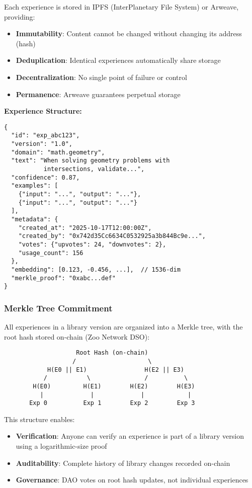 \documentclass[11pt,a4paper]{article}
\begin{document}
Each experience is stored in IPFS (InterPlanetary File System) or Arweave, providing:
\begin{itemize}
    \item \textbf{Immutability}: Content cannot be changed without changing its address (hash)
    \item \textbf{Deduplication}: Identical experiences automatically share storage
    \item \textbf{Decentralization}: No single point of failure or control
    \item \textbf{Permanence}: Arweave guarantees perpetual storage
\end{itemize}

\textbf{Experience Structure:}
\begin{verbatim}
{
  "id": "exp_abc123",
  "version": "1.0",
  "domain": "math.geometry",
  "text": "When solving geometry problems with
           intersections, validate...",
  "confidence": 0.87,
  "examples": [
    {"input": "...", "output": "..."},
    {"input": "...", "output": "..."}
  ],
  "metadata": {
    "created_at": "2025-10-17T12:00:00Z",
    "created_by": "0x742d35Cc6634C0532925a3b844Bc9e...",
    "votes": {"upvotes": 24, "downvotes": 2},
    "usage_count": 156
  },
  "embedding": [0.123, -0.456, ...],  // 1536-dim
  "merkle_proof": "0xabc...def"
}
\end{verbatim}

\subsubsection{Merkle Tree Commitment}

All experiences in a library version are organized into a Merkle tree, with the root hash stored on-chain (Zoo Network DSO):

\begin{verbatim}
                    Root Hash (on-chain)
                   /                    \
            H(E0 || E1)                H(E2 || E3)
           /           \               /          \
        H(E0)         H(E1)        H(E2)        H(E3)
          |             |             |            |
       Exp 0          Exp 1        Exp 2        Exp 3
\end{verbatim}

This structure enables:
\begin{itemize}
    \item \textbf{Verification}: Anyone can verify an experience is part of a library version using a logarithmic-size proof
    \item \textbf{Auditability}: Complete history of library changes recorded on-chain
    \item \textbf{Governance}: DAO votes on root hash updates, not individual experiences
\end{itemize}
\end{document}
